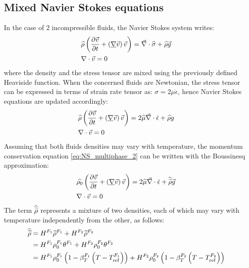 \documentclass[11pt,a4paper]{article}
\begin{document}
\subsection{Mixed Navier Stokes equations}
In the case of 2 incompressible fluids, the Navier Stokes system writes: 
\begin{align}
\label{eq:NS_multiphase}
& \widehat{\rho} \left( \frac{\partial \vec{v}}{\partial t} + \left( \underline{\nabla} \vec{v} \right) \vec{v}  \right) = \vec{\nabla} \cdot \widehat{\sigma} + \widehat{\rho} \vec{g} \\ 
& \nabla \cdot \vec{v} = 0
\end{align}
where the density and the stress tensor are mixed using the previously defined Heaviside function. When the concerned fluids 
are Newtonian, the stress tensor can be expressed in terms of strain rate tensor as: $\sigma = 2\mu \dot{\epsilon}$, hence Navier Stokes 
equations are updated accordingly:
\begin{align}
\label{eq:NS_multiphase_2}
& \widehat{\rho} \left( \frac{\partial \vec{v}}{\partial t} + \left( \underline{\nabla} \vec{v} \right) \vec{v}  \right) = 2\widehat{\mu} \vec{\nabla} \cdot \dot{\epsilon} + \widehat{\rho} g \\ 
& \nabla \cdot \vec{v} = 0
\end{align}
Assuming that both fluids densities may vary with temperature, the momentum conservation equation \eqref{eq:NS_multiphase_2}
can be written with the Boussinesq approximation:
\begin{align}
\label{eq:NS_multiphase_boussinesq}
& \widehat{\rho_0} \left( \frac{\partial \vec{v}}{\partial t} + \left( \underline{\nabla} \vec{v} \right) \vec{v}  \right) = 2\widehat{\mu} \vec{\nabla} \cdot \dot{\epsilon} + \widehat{\widetilde{\rho}} \vec{g} \\ 
& \nabla \cdot \vec{v} = 0
\end{align}
The term $\widehat{\widetilde{\rho}}$ represents a mixture of two densities, each of which may vary with temperature independently from the other,
as follows:
\begin{align}
\label{eq:boussinesq_mix}
\widehat{\widetilde{\rho}} &= H^{F_1} \widetilde{\rho}^{F_1} + H^{F_2} \widetilde{\rho}^{F_2} \\
				&= H^{F_1} \rho_0^{F_1} \theta^{F_1} + H^{F_2} \rho_0^{F_2} \theta^{F_2} \\
				&= H^{F_1} \rho_0^{F_1} \left( 1-\beta_T^{F_1} \left( T-T_{\text{ref}}^{F_1} \right) \right) + H^{F_2} \rho_0^{F_2} \left( 1-\beta_T^{F_2} \left( T-T_{\text{ref}}^{F_2} \right) \right)
\end{align}
\end{document}
